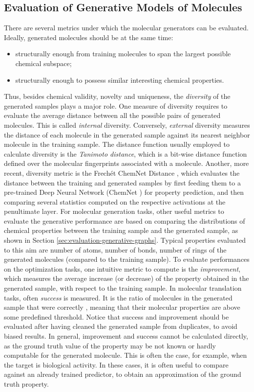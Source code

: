 \subsection{Evaluation of Generative Models of Molecules}
There are several metrics under which the molecular generators can be evaluated. Ideally, generated molecules should be at the same time:
\begin{itemize}
    \item structurally  enough from training molecules to span the largest possible chemical subspace;
    \item structurally  enough to possess similar interesting chemical properties.
\end{itemize}
Thus, besides chemical validity, novelty and uniqueness, the \emph{diversity} of the generated samples plays a major role. One measure of diversity requires to evaluate the average distance between all the possible pairs of generated molecules. This is called \emph{internal} diversity. Conversely, \emph{external} diversity measures the distance of each molecule in the generated sample against its nearest neighbor molecule in the training sample. The distance function usually employed to calculate diversity is the \emph{Tanimoto distance}, which is a bit-wise distance function defined over the molecular fingerprints associated with a molecule. Another, more recent, diversity metric is the Frechét ChemNet Distance \cite{preuer2018frechetdistance}, which evaluates the distance between the training and generated samples by first feeding them to a pre-trained Deep Neural Network (ChemNet \cite{goh2017chemnet}) for property prediction, and then comparing several statistics computed on the respective activations at the penultimate layer.
For molecular generation tasks, other useful metrics to evaluate the generative performance are based on comparing the distributions of chemical properties between the training sample and the generated sample, as shown in Section \ref{sec:evaluation-generative-graphs}. Typical properties evaluated to this aim are number of atoms, number of bonds, number of rings of the generated molecules (compared to the training sample). To evaluate performances on the optimization tasks, one intuitive metric to compute is the \emph{improvement}, which measures the average increase (or decrease) of the property obtained in the generated sample, with respect to the training sample. In molecular translation tasks, often \emph{success} is measured. It is the ratio of molecules in the generated sample that were correctly , meaning that their molecular properties are above some predefined threshold. Notice that success and improvement should be evaluated after having cleaned the generated sample from duplicates, to avoid biased results. In general, improvement and success cannot be calculated directly, as the ground truth value of the property may be not known or hardly computable for the generated molecule. This is often the case, for example, when the target is biological activity. In these cases, it is often useful to compare against an already trained predictor, to obtain an approximation of the ground truth property.


